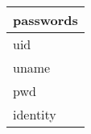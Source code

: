 \documentclass{article}
\begin{document}

\begin{tabular}{|l|} \hline
\textbf{passwords} \\ \hline
uid \\ \hline
uname \\ \hline
pwd \\ \hline
identity \\ \hline
\end{tabular}
\end{document}
